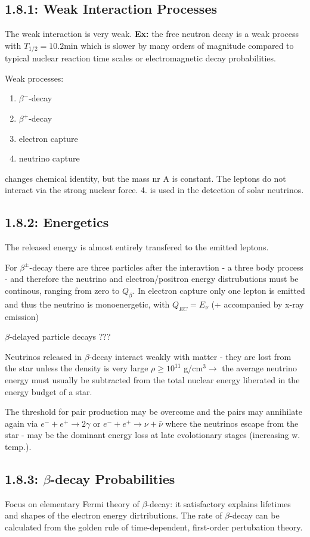\documentclass[a4paper,12pt]{article}
\begin{document}
\subsection*{1.8.1: Weak Interaction Processes}
The weak interaction is very weak. \textbf{Ex:} the free neutron decay is a weak process with $T_{1/2} = 10.2$min which is slower by many orders of magnitude compared to typical nuclear reaction time scales or electromagnetic decay probabilities.  

Weak processes:
\begin{enumerate}
\item $\beta^-$-decay
\item $\beta^+$-decay
\item electron capture
\item neutrino capture
\end{enumerate}
changes chemical identity, but the mass nr A is constant. The leptons do not interact via the strong nuclear force. 4. is used in the detection of solar neutrinos.

\subsection*{1.8.2: Energetics}
The released energy is almost entirely transfered to the emitted leptons. 

For $\beta^\pm$-decay there are three  particles after the interavtion - a three body process - and therefore the neutrino and electron/positron energy distrubutions must be continous, ranging from zero to $Q_\beta$. In electron capture only one lepton is emitted and thus the neutrino is monoenergetic, with $Q_{EC} = E_\nu$ (+ accompanied by  x-ray emission)

$\beta$-delayed particle decays ???

Neutrinos released in $\beta$-decay interact weakly with matter - they are lost from the star unless the density is very large $\rho \geq 10^{11}$ g/cm${}^3 \rightarrow$ the average neutrino energy must usually be subtracted from the total nuclear energy liberated in the energy budget of a star. 

The threshold for pair production may be overcome and the pairs may annihilate again via $e^- + e^+ \rightarrow 2\gamma$ or $e^- + e^+ \rightarrow \nu + \bar{\nu} $ where the neutrinos escape from the star - may be the dominant energy loss at late evolotionary stages (increasing w. temp.).

\subsection*{1.8.3: $\beta$-decay Probabilities}
Focus on elementary Fermi theory of $\beta$-decay: it satisfactory explains lifetimes and shapes of the electron energy dirtributions. The rate of $\beta$-decay can be calculated from the golden rule of time-dependent, first-order pertubation theory. 
\end{document}

